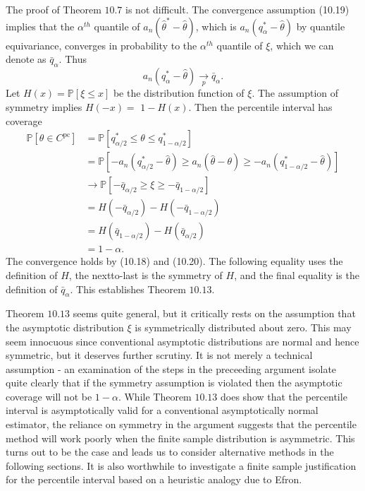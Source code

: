 \documentclass[10pt]{article}
\begin{document}
The proof of Theorem $10.7$ is not difficult. The convergence assumption (10.19) implies that the $\alpha^{t h}$ quantile of $a_{n}\left(\widehat{\theta}^{*}-\widehat{\theta}\right)$, which is $a_{n}\left(q_{\alpha}^{*}-\widehat{\theta}\right)$ by quantile equivariance, converges in probability to the $\alpha^{t h}$ quantile of $\xi$, which we can denote as $\bar{q}_{\alpha}$. Thus
$$
a_{n}\left(q_{\alpha}^{*}-\widehat{\theta}\right) \underset{p}{\longrightarrow} \bar{q}_{\alpha} .
$$
Let $H(x)=\mathbb{P}[\xi \leq x]$ be the distribution function of $\xi$. The assumption of symmetry implies $H(-x)=$ $1-H(x)$. Then the percentile interval has coverage
$$
\begin{aligned}
\mathbb{P}\left[\theta \in C^{\mathrm{pc}}\right] &=\mathbb{P}\left[q_{\alpha / 2}^{*} \leq \theta \leq q_{1-\alpha / 2}^{*}\right] \\
&=\mathbb{P}\left[-a_{n}\left(q_{\alpha / 2}^{*}-\widehat{\theta}\right) \geq a_{n}(\widehat{\theta}-\theta) \geq-a_{n}\left(q_{1-\alpha / 2}^{*}-\widehat{\theta}\right)\right] \\
& \rightarrow \mathbb{P}\left[-\bar{q}_{\alpha / 2} \geq \xi \geq-\bar{q}_{1-\alpha / 2}\right] \\
&=H\left(-\bar{q}_{\alpha / 2}\right)-H\left(-\bar{q}_{1-\alpha / 2}\right) \\
&=H\left(\bar{q}_{1-\alpha / 2}\right)-H\left(\bar{q}_{\alpha / 2}\right) \\
&=1-\alpha .
\end{aligned}
$$
The convergence holds by (10.18) and (10.20). The following equality uses the definition of $H$, the nextto-last is the symmetry of $H$, and the final equality is the definition of $\bar{q}_{\alpha}$. This establishes Theorem $10.13 .$

Theorem $10.13$ seems quite general, but it critically rests on the assumption that the asymptotic distribution $\xi$ is symmetrically distributed about zero. This may seem innocuous since conventional asymptotic distributions are normal and hence symmetric, but it deserves further scrutiny. It is not merely a technical assumption - an examination of the steps in the preceeding argument isolate quite clearly that if the symmetry assumption is violated then the asymptotic coverage will not be $1-\alpha$. While Theorem $10.13$ does show that the percentile interval is asymptotically valid for a conventional asymptotically normal estimator, the reliance on symmetry in the argument suggests that the percentile method will work poorly when the finite sample distribution is asymmetric. This turns out to be the case and leads us to consider alternative methods in the following sections. It is also worthwhile to investigate a finite sample justification for the percentile interval based on a heuristic analogy due to Efron.
\end{document}
